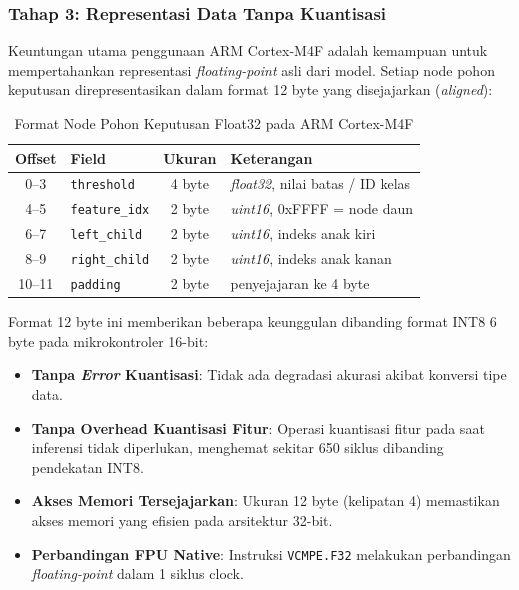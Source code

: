 \subsubsection{Tahap 3: Representasi Data Tanpa Kuantisasi}

Keuntungan utama penggunaan ARM Cortex-M4F adalah kemampuan untuk mempertahankan representasi \textit{floating-point} asli dari model. Setiap node pohon keputusan direpresentasikan dalam format 12 byte yang disejajarkan (\textit{aligned}):

\begin{table}[htbp]
\centering
\caption{Format Node Pohon Keputusan Float32 pada ARM Cortex-M4F}
\label{tab:arm_node_format}
\begin{tabular}{clcl}
\hline
\textbf{Offset} & \textbf{Field} & \textbf{Ukuran} & \textbf{Keterangan} \\
\hline
0--3 & \texttt{threshold} & 4 byte & \textit{float32}, nilai batas / ID kelas \\
4--5 & \texttt{feature\_idx} & 2 byte & \textit{uint16}, 0xFFFF = node daun \\
6--7 & \texttt{left\_child} & 2 byte & \textit{uint16}, indeks anak kiri \\
8--9 & \texttt{right\_child} & 2 byte & \textit{uint16}, indeks anak kanan \\
10--11 & \texttt{padding} & 2 byte & penyejajaran ke 4 byte \\
\hline
\end{tabular}
\end{table}

Format 12 byte ini memberikan beberapa keunggulan dibanding format INT8 6 byte pada mikrokontroler 16-bit:
\begin{itemize}
    \item \textbf{Tanpa \textit{Error} Kuantisasi}: Tidak ada degradasi akurasi akibat konversi tipe data.
    \item \textbf{Tanpa Overhead Kuantisasi Fitur}: Operasi kuantisasi fitur pada saat inferensi tidak diperlukan, menghemat sekitar 650 siklus dibanding pendekatan INT8.
    \item \textbf{Akses Memori Tersejajarkan}: Ukuran 12 byte (kelipatan 4) memastikan akses memori yang efisien pada arsitektur 32-bit.
    \item \textbf{Perbandingan FPU Native}: Instruksi \texttt{VCMPE.F32} melakukan perbandingan \textit{floating-point} dalam 1 siklus clock.
\end{itemize}

